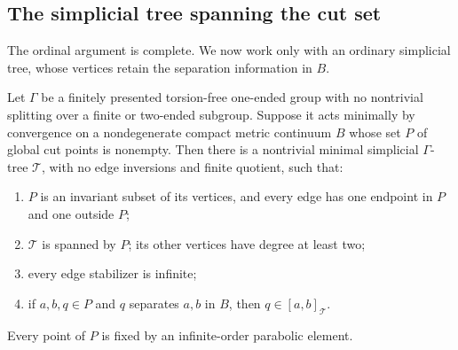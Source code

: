 \subsection{The simplicial tree spanning the cut set}

The ordinal argument is complete.  We now work only with an ordinary
simplicial tree, whose vertices retain the separation information in $B$.

\begin{proposition}\label{pret:tree}
Let $\Gamma$ be a finitely presented torsion-free one-ended group with no
nontrivial splitting over a finite or two-ended subgroup.  Suppose it acts
minimally by convergence on a nondegenerate compact metric continuum $B$
whose set $P$ of global cut points is nonempty.  Then there is a
nontrivial minimal simplicial $\Gamma$-tree $\mathcal T$, with no edge
inversions and finite quotient, such that:
\begin{enumerate}[label=\textup{(\roman*)}]
\item $P$ is an invariant subset of its vertices, and every edge has one
endpoint in $P$ and one outside $P$;
\item $\mathcal T$ is spanned by $P$; its other vertices have degree at
least two;
\item every edge stabilizer is infinite;
\item if $a,b,q\in P$ and $q$ separates $a,b$ in $B$, then
$q\in[a,b]_{\mathcal T}$.
\end{enumerate}
Every point of $P$ is fixed by an infinite-order parabolic element.
\end{proposition}

